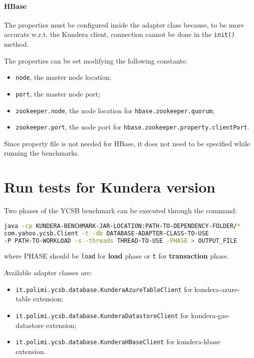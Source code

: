 \paragraph{HBase}
The properties must be configured inside the adapter class because, to be more accurate w.r.t. the Kundera client, connection cannot be done in the \texttt{init()} method. 

\noindent The properties can be set modifying the following constants:
\begin{itemize}
\item \texttt{node}, the master node location;
\item \texttt{port}, the master node port;
\item \texttt{zookeeper.node}, the node location for \texttt{hbase.zookeeper.quorum};
\item \texttt{zookeeper.port}, the node port for \texttt{hbase.zookeeper.property.clientPort}.
\end{itemize}

\noindent Since property file is not needed for HBase, it does not need to be specified while running the benchmarks.

\section{Run tests for Kundera version}
\label{appendix:ycsb-kundera}
Two phases of the YCSB benchmark can be executed through the command:

\begin{lstlisting}[language=bash, caption=Run Kundera clients benchmarks, numbers=none]
java -cp KUNDERA-BENCHMARK-JAR-LOCATION:PATH-TO-DEPENDENCY-FOLDER/*
com.yahoo.ycsb.Client -t -db DATABASE-ADAPTER-CLASS-TO-USE
-P PATH-TO-WORKLOAD -s -threads THREAD-TO-USE -PHASE > OUTPUT_FILE
\end{lstlisting}

\noindent where PHASE should be \texttt{load} for \textbf{load} phase or \texttt{t} for \textbf{transaction} phase.

\newparagraph Available adapter classes are:
\begin{itemize}
\item \texttt{it.polimi.ycsb.database.KunderaAzureTableClient} for kundera-azure-table extension;
\item \texttt{it.polimi.ycsb.database.KunderaDatastoreClient} for kundera-gae-datastore extension;
 \item\texttt{it.polimi.ycsb.database.KunderaHBaseClient} for kundera-hbase extension.
\end{itemize}


